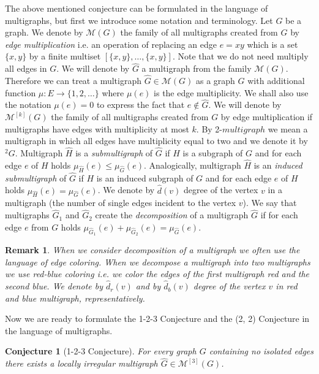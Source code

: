 \documentclass[12pt]{article}
\newtheorem{cnj}[tw]{Conjecture}
\newtheorem{rem}[tw]{Remark}
\begin{document}
The above mentioned conjecture can be formulated in the language of multigraphs, but first we introduce some notation and terminology. Let $G$ be a graph. We denote by $\mathcal{M}(G)$ the family of all multigraphs created from $G$ by \textit{edge multiplication} i.e. an operation of replacing an edge $e=xy$ which is a set $\{x, y\}$ by a finite multiset $[\{x, y\}, \dots, \{x, y\}]$. Note that we do not need multiply all edges in $G$. We will denote by $\hat G$ a multigraph from the family $\mathcal{M}(G)$. Therefore we can treat a multigraph $\hat G \in \mathcal{M}(G)$ as a graph $G$ with additional function $\mu: E \rightarrow \{1, 2, \dots\}$ where $\mu(e)$ is the edge multiplicity. We shall also use the notation $\mu(e)=0$ to express the fact that $e \notin \hat G$.  We will denote by $\mathcal{M}^{[k]}(G)$ the family of all multigraphs created from $G$ by edge multiplication if multigraphs have edges with multiplicity at most $k$. By 2-$multigraph$ we mean a multigraph in which all edges have multiplicity equal to two and we denote it by $^2G$. Multigraph $\hat H$ is a \textit{submultigraph} of $\hat G$ if $H$ is a subgraph of $G$ and for each edge $e$ of $H$ holds $\mu_{\hat H}(e) \leq \mu_{\hat G}(e)$.  Analogically, multigraph $\hat H$ is an \textit{induced submultigraph} of $\hat G$ if $H$ is an induced subgraph of $G$ and for each edge $e$ of $H$ holds $\mu_{\hat H}(e)= \mu_{\hat G}(e)$. We denote by $\hat d(v)$ degree of the vertex $v$ in a multigraph (the number of single edges incident to the vertex $v$). We say that multigraphs $\hat G_1$ and $\hat G_2$ create the \textit{decomposition} of a multigraph $\hat G$ if for each edge $e$ from $G$ holds $\mu_{\hat G_1}(e)+ \mu_{\hat G_2}(e)= \mu_{\hat G}(e)$.
\begin{rem}
When we consider decomposition of a multigraph we often use the language of edge  coloring. When we decompose a multigraph into two multigraphs we use red-blue coloring i.e. we color the edges of the first multigraph red and the second blue. We denote by $\hat d_r(v)$ and by $\hat d_b(v)$ degree of the vertex $v$ in red and blue multigraph, representatively.
\end{rem}
Now we are ready to formulate the 1-2-3 Conjecture and the (2, 2) Conjecture in the language of multigraphs.

\begin{cnj}[1-2-3 Conjecture]
For every graph $G$ containing no isolated edges there exists a locally irregular multigraph $\hat G\in \mathcal{M}^{[3]}(G)$.
\end{cnj}
\end{document}
